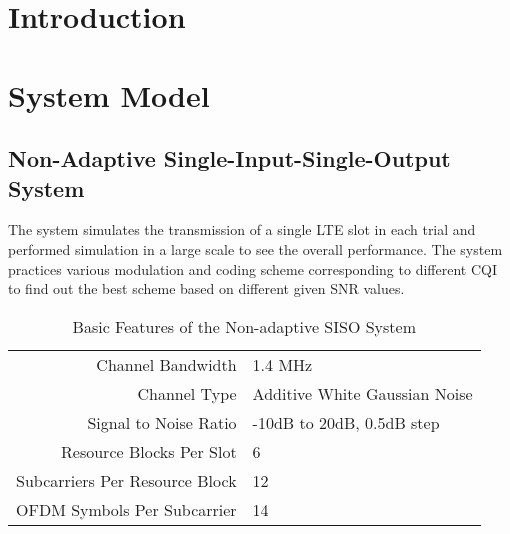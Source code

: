 \documentclass[journal,comsoc]{IEEEtran}
\begin{document}
%
\IEEEpeerreviewmaketitle



\section{Introduction}

%
%
%
%

\IEEEPARstart
\section{System Model}


\subsection{Non-Adaptive Single-Input-Single-Output System}

The system simulates the transmission of a single LTE slot in each trial and performed simulation in a large scale to see the overall performance.
The system practices various modulation and coding scheme corresponding to different CQI to find out the best scheme based on different given SNR values.

\begin{table}[h!]
\centering
\caption{Basic Features of the Non-adaptive SISO System}
\label{my-label}
\begin{tabular}{rl}

Channel Bandwidth                               & 1.4 MHz                              \\
Channel Type                                    & Additive White Gaussian Noise        \\
Signal to Noise Ratio                           & -10dB to 20dB, 0.5dB step         \\
Resource Blocks Per Slot                      & 6                                    \\
Subcarriers Per Resource Block       & 12                                   \\
OFDM Symbols Per Subcarrier          & 14
\end{tabular}
\end{table}
\end{document}
